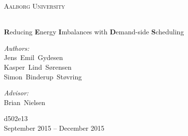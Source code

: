 \newcommand{\HRule}{\rule{\linewidth}{0.5mm}}
\begin{titlingpage}
  \begin{center}
    \vspace*{0.5cm}

    \textsc{\LARGE Aalborg University}\\[1.5cm]

    \vspace{2.5cm}

    {\HUGE \bfseries \productname{}}\\
    \vspace{0.2cm}
    {\small \textbf{R}educing \textbf{E}nergy \textbf{I}mbalances with \textbf{D}emand-side \textbf{S}cheduling \\[0.4cm] }

    \vspace{2.5cm}

    \begin{minipage}[t]{0.4\textwidth}
      \begin{flushleft} \large
        \emph{Authors:}\\
        Jens~Emil~Gydesen\\
        Kasper~Lind~Sørensen\\
        Simon~Binderup~Støvring
      \end{flushleft}
    \end{minipage}
    \begin{minipage}[t]{0.4\textwidth}
      \begin{flushright} \large
        \emph{Advisor:} \\
        Brian~Nielsen
      \end{flushright}
    \end{minipage}

    \vfill

    {\normalsize d502e13}\\
    {\large September 2015 -- December 2015}

  \end{center}
\end{titlingpage}
